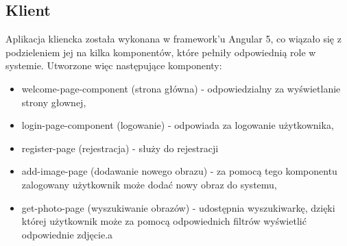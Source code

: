\subsection {Klient}
Aplikacja kliencka została wykonana w framework'u Angular 5, co wiązało się z podzieleniem jej na kilka komponentów, które pełniły odpowiednią role w systemie. Utworzone więc następujące komponenty:
\begin{itemize}
	\item welcome-page-component (strona główna) - odpowiedzialny za wyświetlanie strony głownej, 
	\item login-page-component (logowanie) - odpowiada za logowanie użytkownika,
	\item register-page (rejestracja) - służy do rejestracji 
	\item add-image-page (dodawanie nowego obrazu) - za pomocą tego komponentu zalogowany użytkownik może dodać nowy obraz do systemu,
	\item get-photo-page (wyszukiwanie obrazów) - udostępnia wyszukiwarkę, dzięki której użytkownik może za pomocą odpowiednich filtrów wyświetlić odpowiednie zdjęcie.a
	
\end{itemize}

